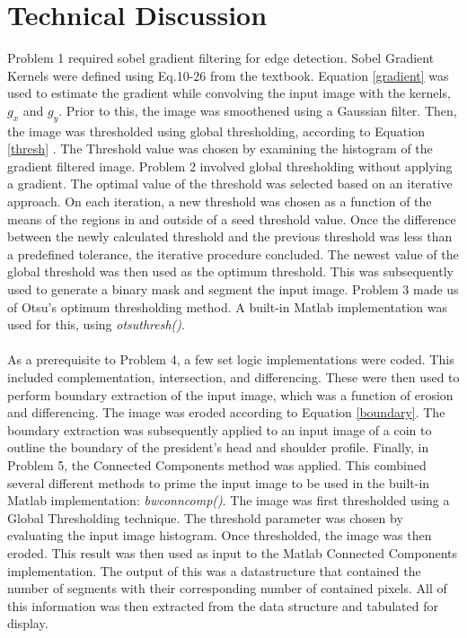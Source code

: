 \documentclass[./rarnold_project_89.tex]{subfiles}
\begin{document}
\clearpage

\section*{Technical Discussion}

\noindent Problem 1 required sobel gradient filtering for edge detection.  Sobel Gradient Kernels were defined using Eq.10-26 from the textbook. 
Equation \eqref{gradient} was used to estimate the gradient while convolving the input image with the kernels, $g_x$ and $g_y$.
Prior to this, the image was smoothened using a Gaussian filter.  Then, the image was thresholded using global thresholding, according to Equation \eqref{thresh} . The Threshold value was chosen by 
examining the histogram of the gradient filtered image.  Problem 2 involved global thresholding without applying a gradient.  The 
optimal value of the threshold was selected based on an iterative approach.  On each iteration, a new threshold was chosen as a
function of the means of the regions in and outside of a seed threshold value.  Once the difference between the newly calculated 
threshold and the previous threshold was less than a predefined tolerance, the iterative procedure concluded.  The newest value of 
the global threshold was then used as the optimum threshold.  This was subsequently used to generate a binary mask and segment the input image.
Problem 3 made us of Otsu's optimum thresholding method.  A built-in Matlab implementation was used for this, using \textit{otsuthresh()}.
\\ \\
\noindent As a prerequisite to Problem 4, a few set logic implementations were coded.  This included complementation, intersection, and differencing.
These were then used to perform boundary extraction of the input image, which was a function of erosion and differencing.  The image
was eroded according to Equation \eqref{boundary}.  The boundary extraction was subsequently applied to an input image of a coin to outline the 
boundary of the president's head and shoulder profile.  Finally, in Problem 5, the Connected Components method was applied.  This combined
several different methods to prime the input image to be used in the built-in Matlab implementation: \textit{bwconncomp()}.  The image was first
thresholded using a Global Thresholding technique.  The threshold parameter was chosen by evaluating the input image histogram.  
Once thresholded, the image was then eroded.  This result was then used as input to the Matlab Connected Components implementation.
The output of this was a datastructure that contained the number of segments with their corresponding number of contained pixels.
All of this information was then extracted from the data structure and tabulated for display.  
\end{document}
